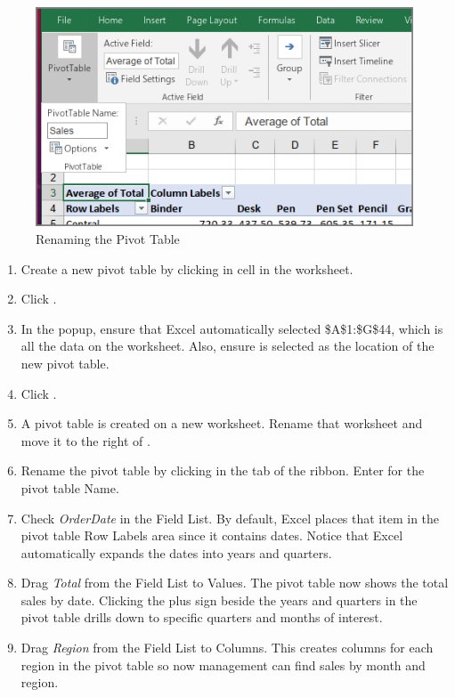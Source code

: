 \begin{figure}[H]
	\centering
	\includegraphics[width=\maxwidth{.95\linewidth}]{gfx/ch07_fig20}
	\caption{Renaming the Pivot Table}
	\label{07:fig20}
\end{figure}

\begin{enumerate}[resume]
	\item Create a new pivot table by clicking in cell  in the  worksheet.
	\item Click .
	\item In the  popup, ensure that Excel automatically selected \$A\$1:\$G\$44, which is all the data on the worksheet. Also, ensure  is selected as the location of the new pivot table. 
	\item Click .
	\item A pivot table is created on a new worksheet. Rename that worksheet  and move it to the right of .
	\item Rename the pivot table by clicking  in the  tab of the ribbon. Enter  for the pivot table Name.
	\item Check \textit{OrderDate} in the Field List. By default, Excel places that item in the pivot table Row Labels area since it contains dates. Notice that Excel automatically expands the dates into years and quarters.
	\item Drag \textit{Total} from the Field List to Values. The pivot table now shows the total sales by date. Clicking the plus sign beside the years and quarters in the pivot table drills down to specific quarters and months of interest.
	\item Drag \textit{Region} from the Field List to Columns. This creates columns for each region in the pivot table so now management can find sales by month and region.
	\end{enumerate}	

